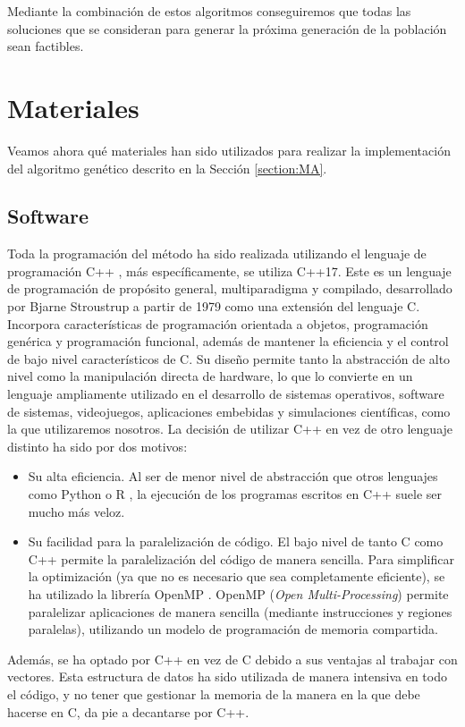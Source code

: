 Mediante la combinación de estos algoritmos conseguiremos que todas las soluciones que se consideran para generar la próxima generación de la población sean factibles.

\section{Materiales}
Veamos ahora qué materiales han sido utilizados para realizar la implementación del algoritmo genético descrito en la Sección \ref{section:MA}.
\subsection{Software}\label{section:materiales-software}
Toda la programación del método ha sido realizada utilizando el lenguaje de programación C++ \cite{cpp17}, más específicamente, se utiliza C++17. Este es un lenguaje de programación de propósito general, multiparadigma y compilado, desarrollado por Bjarne Stroustrup a partir de 1979 como una extensión del lenguaje C. Incorpora características de programación orientada a objetos, programación genérica y programación funcional, además de mantener la eficiencia y el control de bajo nivel característicos de C. Su diseño permite tanto la abstracción de alto nivel como la manipulación directa de hardware, lo que lo convierte en un lenguaje ampliamente utilizado en el desarrollo de sistemas operativos, software de sistemas, videojuegos, aplicaciones embebidas y simulaciones científicas, como la que utilizaremos nosotros. La decisión de utilizar C++ en vez de otro lenguaje distinto ha sido por dos motivos:
\begin{itemize}
    \item Su alta eficiencia. Al ser de menor nivel de abstracción que otros lenguajes como Python \cite{Python} o R \cite{R}, la ejecución de los programas escritos en C++ suele ser mucho más veloz.
    \item Su facilidad para la paralelización de código. El bajo nivel de tanto C como C++ permite la paralelización del código de manera sencilla. Para simplificar la optimización (ya que no es necesario que sea completamente eficiente), se ha utilizado la librería OpenMP \cite{openmp2021}. OpenMP (\textit{Open Multi-Processing}) permite paralelizar aplicaciones de manera sencilla (mediante instrucciones y regiones paralelas), utilizando un modelo de programación de memoria compartida.  
\end{itemize}
Además, se ha optado por C++ en vez de C debido a sus ventajas al trabajar con vectores. Esta estructura de datos ha sido utilizada de manera intensiva en todo el código, y no tener que gestionar la memoria de la manera en la que debe hacerse en C, da pie a decantarse por C++.\\

